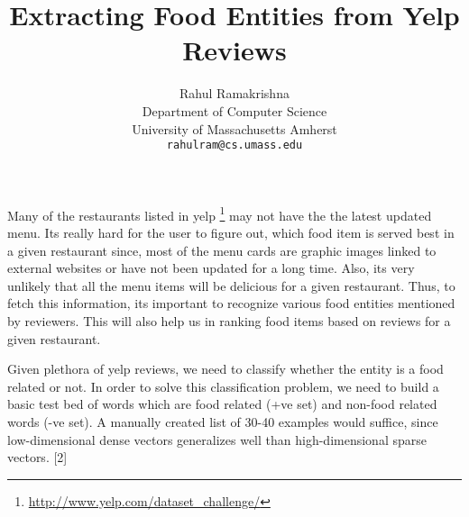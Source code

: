 \documentclass{article} %
\title{Extracting Food Entities from Yelp Reviews}
\author{
Rahul Ramakrishna \\
Department of Computer Science\\
University of Massachusetts Amherst\\
\texttt{rahulram@cs.umass.edu} \\
}
\begin{document}
\maketitle




Many of the restaurants listed in yelp \footnote{\url{http://www.yelp.com/dataset_challenge/}} may not have the the latest updated menu. Its really hard for the user to figure out, which food item is served best in a given restaurant since, most of the menu cards are graphic images linked to external websites or have not been updated for a long time. Also, its very unlikely that all the menu items will be delicious for a given restaurant. Thus, to fetch this information, its important to recognize various food entities mentioned by reviewers. This will also help us in ranking food items based on reviews for a given restaurant. 

Given plethora of yelp reviews, we need to classify whether the entity is a food related or not. In order to solve this classification problem, we need to build a basic test bed of words which are food related (+ve set) and non-food related words (-ve set). A manually created list of 30-40 examples would suffice, since low-dimensional dense vectors generalizes well than high-dimensional sparse vectors. [2]
\end{document}

